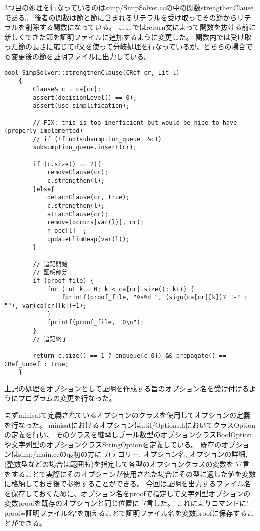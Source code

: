 3つ目の処理を行なっているのはsimp/SimpSolver.ccの中の関数strengthenClauseである。
後者の関数は節と節に含まれるリテラルを受け取ってその節からリテラルを削除する関数になっている。
ここではreturn文によって関数を抜ける前に新しくできた節を証明ファイルに追加するように変更した。
関数内では受け取った節の長さに応じてif文を使って分岐処理を行なっているが、どちらの場合でも変更後の節を証明ファイルに出力している。
\begin{lstlisting}[caption=関数strengthenClauseの変更(simp/SimpSolver.cc), firstnumber=203]
    bool SimpSolver::strengthenClause(CRef cr, Lit l)
    {
        Clause& c = ca[cr];
        assert(decisionLevel() == 0);
        assert(use_simplification);

        // FIX: this is too inefficient but would be nice to have (properly implemented)
        // if (!find(subsumption_queue, &c))
        subsumption_queue.insert(cr);

        if (c.size() == 2){
            removeClause(cr);
            c.strengthen(l);
        }else{
            detachClause(cr, true);
            c.strengthen(l);
            attachClause(cr);
            remove(occurs[var(l)], cr);
            n_occ[l]--;
            updateElimHeap(var(l));
        }

        // 追記開始
        // 証明部分
        if (proof_file) {
            for (int k = 0; k < ca[cr].size(); k++) {
                fprintf(proof_file, "%s%d ", (sign(ca[cr][k])? "-" : ""), var(ca[cr][k])+1);
            }
            fprintf(proof_file, "0\n");
        }
        // 追記終了

        return c.size() == 1 ? enqueue(c[0]) && propagate() == CRef_Undef : true;
    }
\end{lstlisting}

上記の処理をオプションとして証明を作成する旨のオプション名を受け付けるようにプログラムの変更を行なった。

まずminisatで定義されているオプションのクラスを使用してオプションの定義を行なった。
minisatにおけるオプションはutil/Options.hにおいてクラスOptionの定義を行い、
そのクラスを継承しブール数型のオプションクラスBoolOptionや文字列型のオプションクラスStringOptionを定義している。
既存のオプションはsimp/main.ccの最初の方に
カテゴリー, オプション名, オプションの詳細, (整数型などの場合は範囲も)を指定して各型のオプションクラスの変数を
宣言をすることで実際にそのオプションが使用された場合にその型に適した値を変数に格納しておき後で参照することができる。
今回は証明を出力するファイル名を保存しておくために、オプション名をproofで指定して文字列型オプションの変数proofを既存のオプションと同じ位置に宣言した。
これによりコマンドに"-proof=証明ファイル名"を加えることで証明ファイル名を変数proofに保存することができる。

